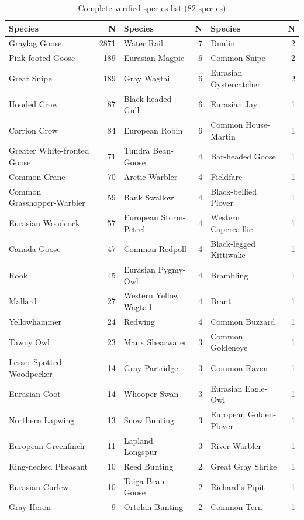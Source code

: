 \documentclass[twocolumn]{article}
\begin{document}
\begin{table}[H]
\centering
\caption{Complete verified species list (82 species)}
\label{tab:species_full}
\tiny
\begin{tabular}{lr|lr|lr}
\toprule
\textbf{Species} & \textbf{N} & \textbf{Species} & \textbf{N} & \textbf{Species} & \textbf{N} \\
\midrule
Graylag Goose & 2871 & Water Rail & 7 & Dunlin & 2 \\
Pink-footed Goose & 189 & Eurasian Magpie & 6 & Common Snipe & 2 \\
Great Snipe & 189 & Gray Wagtail & 6 & Eurasian Oystercatcher & 2 \\
Hooded Crow & 87 & Black-headed Gull & 6 & Eurasian Jay & 1 \\
Carrion Crow & 84 & European Robin & 6 & Common House-Martin & 1 \\
Greater White-fronted Goose & 71 & Tundra Bean-Goose & 4 & Bar-headed Goose & 1 \\
Common Crane & 70 & Arctic Warbler & 4 & Fieldfare & 1 \\
Common Grasshopper-Warbler & 59 & Bank Swallow & 4 & Black-bellied Plover & 1 \\
Eurasian Woodcock & 57 & European Storm-Petrel & 4 & Western Capercaillie & 1 \\
Canada Goose & 47 & Common Redpoll & 4 & Black-legged Kittiwake & 1 \\
Rook & 45 & Eurasian Pygmy-Owl & 4 & Brambling & 1 \\
Mallard & 27 & Western Yellow Wagtail & 4 & Brant & 1 \\
Yellowhammer & 24 & Redwing & 4 & Common Buzzard & 1 \\
Tawny Owl & 23 & Manx Shearwater & 3 & Common Goldeneye & 1 \\
Lesser Spotted Woodpecker & 14 & Gray Partridge & 3 & Common Raven & 1 \\
Eurasian Coot & 14 & Whooper Swan & 3 & Eurasian Eagle-Owl & 1 \\
Northern Lapwing & 13 & Snow Bunting & 3 & European Golden-Plover & 1 \\
European Greenfinch & 11 & Lapland Longspur & 3 & River Warbler & 1 \\
Ring-necked Pheasant & 10 & Reed Bunting & 2 & Great Gray Shrike & 1 \\
Eurasian Curlew & 10 & Taiga Bean-Goose & 2 & Richard's Pipit & 1 \\
Gray Heron & 9 & Ortolan Bunting & 2 & Common Tern & 1 \\

\end{tabular}
\end{table}
\end{document}
